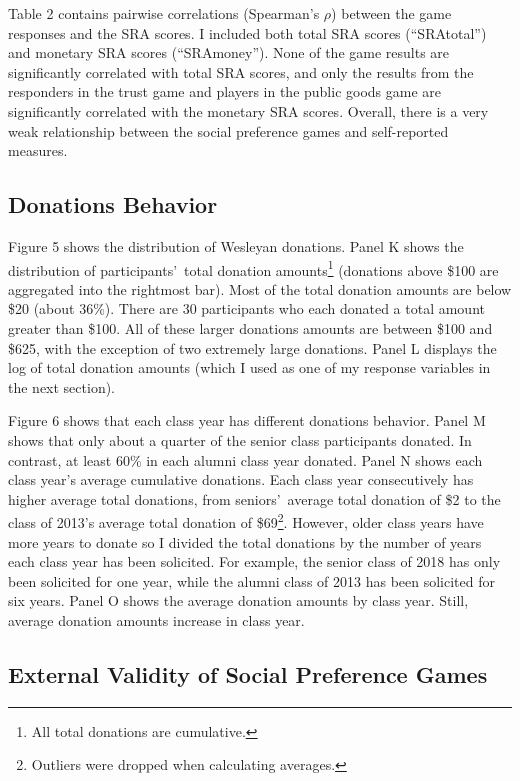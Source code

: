 \documentclass[12pt]{article}
\begin{document}
Table 2 contains pairwise correlations (Spearman\rq s \(\rho\)) between the game responses and the SRA scores. I included both total SRA scores (``SRAtotal'') and monetary SRA scores (``SRAmoney''). None of the game results are significantly correlated with total SRA scores, and only the results from the responders in the trust game and players in the public goods game are significantly correlated with the monetary SRA scores. Overall, there is a very weak relationship between the social preference games and self-reported measures. 

\subsection{Donations Behavior}

Figure 5 shows the distribution of Wesleyan donations. Panel K shows the distribution of participants\rq \ total donation amounts\footnote{All total donations are cumulative.} (donations above \$100 are aggregated into the rightmost bar). Most of the total donation amounts are below \$20 (about 36\%). There are 30 participants who each donated a total amount greater than \$100. All of these larger donations amounts are between \$100 and \$625, with the exception of two extremely large donations. Panel L displays the log of total donation amounts (which I used as one of my response variables in the next section).

Figure 6 shows that each class year has different donations behavior. Panel M shows that only about a quarter of the senior class participants donated. In contrast, at least 60\% in each alumni class year donated. Panel N shows each class year\rq s average cumulative donations. Each class year consecutively has higher average total donations, from seniors\rq \ average total donation of \$2 to the class of 2013\rq s average total donation of \$69\footnote{Outliers were dropped when calculating averages.}. However, older class years have more years to donate so I divided the total donations by the number of years each class year has been solicited. For example, the senior class of 2018 has only been solicited for one year, while the alumni class of 2013 has been solicited for six years. Panel O shows the average donation amounts by class year. Still, average donation amounts increase in class year.


\subsection{External Validity of Social Preference Games}
\end{document}
